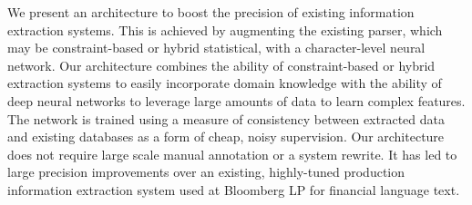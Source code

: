 We present an architecture to boost the precision of existing information extraction systems. This is achieved by augmenting the existing parser, which may be constraint-based or hybrid statistical, with a character-level neural network. Our architecture combines the ability of constraint-based or hybrid extraction systems to easily incorporate domain knowledge with the ability of deep neural networks to leverage large amounts of data to learn complex features. The network is trained using a measure of consistency between extracted data and existing databases as a form of cheap, noisy supervision. Our architecture does not require large scale manual annotation or a system rewrite. It has led to large precision improvements over an existing, highly-tuned production information extraction system used at Bloomberg LP for financial language text.
